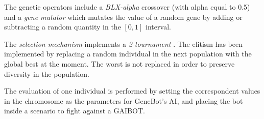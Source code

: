 \documentclass{llncs}
\begin{document}
The genetic operators include a \textit{BLX-alpha} crossover
\cite{Herrera03ataxonomy} (with alpha equal to 0.5) and a \textit{gene
  mutator} which mutates the value of a random gene by adding or
subtracting a random quantity in the $[0,1]$ interval. 


The \textit{selection mechanism} implements a \textit{2-tournament}
\cite{EvoCompI}. %
The elitism has been implemented by replacing a random individual in
the next population with the global best at the moment. The worst is
not replaced in order to preserve diversity in the population.

The evaluation of one individual is performed by setting the correspondent values in the chromosome as the parameters for GeneBot's AI, and placing the bot inside a scenario to fight against a GAIBOT. 
\end{document}
